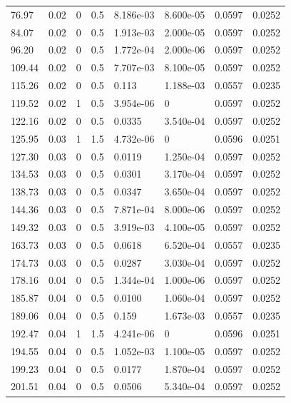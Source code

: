 \documentclass[preview]{standalone}
\begin{document}
{{\begin{tabular}{L{1.2cm}C{1.2cm} C{0.3cm}C{0.5cm} C{1.4cm}C{1.4cm} C{1.4cm}C{1.4cm}}
  76.97  &  0.02  & 0     & 0.5 &  8.186e-03  & 8.600e-05  & 0.0597 &  0.0252   \\ 
  84.07  &  0.02  & 0     & 0.5 &  1.913e-03  & 2.000e-05  & 0.0597 &  0.0252   \\ 
  96.20  &  0.02  & 0     & 0.5 &  1.772e-04  & 2.000e-06  & 0.0597 &  0.0252   \\ 
  109.44  &  0.02  & 0     & 0.5 &  7.707e-03  & 8.100e-05  & 0.0597 &  0.0252   \\ 
  115.26  &  0.02  & 0     & 0.5 &  0.113  & 1.188e-03  & 0.0557 &  0.0235   \\ 
  119.52  &  0.02  & 1     & 0.5 &  3.954e-06  & 0  & 0.0597 &  0.0252   \\ 
  122.16  &  0.02  & 0     & 0.5 &  0.0335  & 3.540e-04  & 0.0597 &  0.0252   \\ 
  125.95  &  0.03  & 1     & 1.5 &  4.732e-06  & 0  & 0.0596 &  0.0251   \\ 
  127.30  &  0.03  & 0     & 0.5 &  0.0119  & 1.250e-04  & 0.0597 &  0.0252   \\ 
  134.53  &  0.03  & 0     & 0.5 &  0.0301  & 3.170e-04  & 0.0597 &  0.0252   \\ 
  138.73  &  0.03  & 0     & 0.5 &  0.0347  & 3.650e-04  & 0.0597 &  0.0252   \\ 
  144.36  &  0.03  & 0     & 0.5 &  7.871e-04  & 8.000e-06  & 0.0597 &  0.0252   \\ 
  149.32  &  0.03  & 0     & 0.5 &  3.919e-03  & 4.100e-05  & 0.0597 &  0.0252   \\ 
  163.73  &  0.03  & 0     & 0.5 &  0.0618  & 6.520e-04  & 0.0557 &  0.0235   \\ 
  174.73  &  0.03  & 0     & 0.5 &  0.0287  & 3.030e-04  & 0.0597 &  0.0252   \\ 
  178.16  &  0.04  & 0     & 0.5 &  1.344e-04  & 1.000e-06  & 0.0597 &  0.0252   \\ 
  185.87  &  0.04  & 0     & 0.5 &  0.0100  & 1.060e-04  & 0.0597 &  0.0252   \\ 
  189.06  &  0.04  & 0     & 0.5 &  0.159  & 1.673e-03  & 0.0557 &  0.0235   \\ 
  192.47  &  0.04  & 1     & 1.5 &  4.241e-06  & 0  & 0.0596 &  0.0251   \\ 
  194.55  &  0.04  & 0     & 0.5 &  1.052e-03  & 1.100e-05  & 0.0597 &  0.0252   \\ 
  199.23  &  0.04  & 0     & 0.5 &  0.0177  & 1.870e-04  & 0.0597 &  0.0252   \\ 
  201.51  &  0.04  & 0     & 0.5 &  0.0506  & 5.340e-04  & 0.0597 &  0.0252   \\ 

\end{tabular}}}
\end{document}
